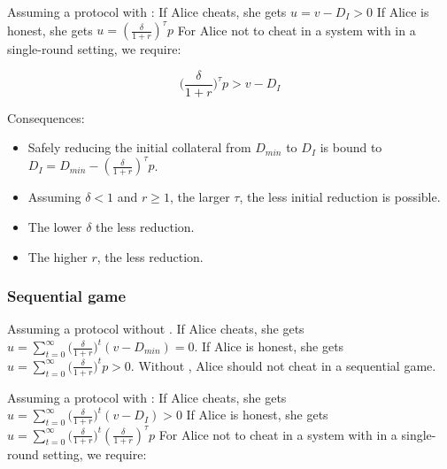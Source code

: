 \begin{enumerate}
Assuming a protocol with \sys:
If Alice cheats, she gets $u = v - D_I > 0$
If Alice is honest, she gets $u = (\frac{\delta}{1+r})^{\tau} p$
For Alice not to cheat in a system with \sys in a single-round setting, we require:

\begin{equation}
    \big( \frac{\delta}{1+r} \big)^{\tau} p > v - D_I
\end{equation}

Consequences:
\begin{itemize}
    \item Safely reducing the initial collateral from $D_{min}$ to $D_I$ is bound to $D_I = D_{min} - (\frac{\delta}{1+r})^{\tau} p$.
    \item Assuming $\delta < 1$ and $r \geq 1$, the larger $\tau$, the less initial reduction is possible.
    \item The lower $\delta$ the less reduction.
    \item The higher $r$, the less reduction.
\end{itemize}

\subsubsection{Sequential game}
Assuming a protocol without \sys.
If Alice cheats, she gets $u = \sum_{t=0}^{\infty} \big( \frac{\delta}{1+r} \big)^{t} (v - D_{min}) = 0$.
If Alice is honest, she gets $u = \sum_{t=0}^{\infty} \big( \frac{\delta}{1+r} \big)^{t} p > 0$.
Without \sys, Alice should not cheat in a sequential game.

Assuming a protocol with \sys:
If Alice cheats, she gets $u = \sum_{t=0}^{\infty} \big( \frac{\delta}{1+r} \big)^{t} (v - D_{I}) > 0$
If Alice is honest, she gets $u = \sum_{t=0}^{\infty} \big( \frac{\delta}{1+r} \big)^{t} (\frac{\delta}{1+r})^{\tau} p$
For Alice not to cheat in a system with \sys in a single-round setting, we require:








\end{enumerate}
